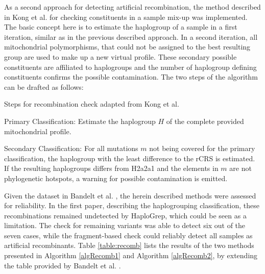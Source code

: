  
As a second approach for detecting artificial recombination, the method described in Kong et al. \cite{Kong2008} for checking constituents in a sample mix-up was implemented. The basic concept here is to estimate the haplogroup of a sample in a first iteration, similar as in the previous described approach. In a second iteration, all mitochondrial polymorphisms, that could not be assigned to the best resulting group are used to make up a new virtual profile. These secondary possible constituents are affiliated to haplogroups and the number of haplogroup defining constituents confirms the possible contamination. The two steps of the algorithm can be drafted as follows:
\begin{algorithm}
  \caption{Steps for recombination check adapted from Kong et al.}
  \label{algRecomb2}
Primary Classification: Estimate the haplogroup $H$ of the complete provided mitochondrial profile. 

Secondary Classification: For all mutations $m$ not being covered for the primary classification, the haplogroup with the least difference to the rCRS is estimated. If the resulting haplogroups differs from H2a2a1 and the elements in $m$ are not phylogenetic hotspots, a warning for possible contamination is emitted.
\end{algorithm}

Given the dataset in Bandelt et al. \cite{Bandelt2012}, the herein described methods were assessed for reliability. In the first paper, describing the haplogrouping classification, these recombinations remained undetected by HaploGrep, which could be seen as a limitation. The check for remaining variants was able to detect six out of the seven cases, while the fragment-based check could reliably detect all samples as artificial recombinants. Table \ref{table:recomb} lists the results of the two methods presented in Algorithm \ref{algRecomb1} and Algorithm \ref{algRecomb2}, by extending the table provided by Bandelt et al. \cite{Bandelt2012}. 


